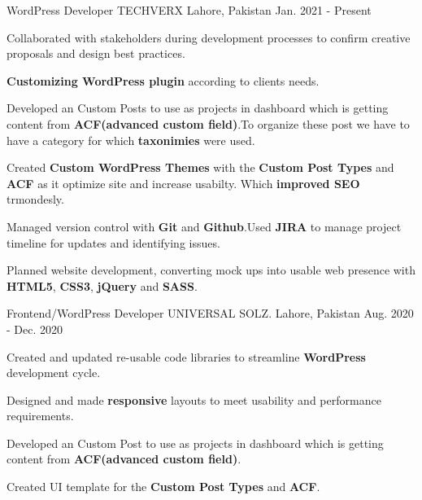 

\begin{cventries}

  \cventry
    {WordPress Developer} %
    {TECHVERX} %
    {Lahore, Pakistan} %
    {Jan. 2021 - Present} %
    {
      \begin{cvitems} %
        \item {Collaborated with stakeholders during development processes to confirm creative proposals and design best practices.}
        \item {\textbf{Customizing WordPress plugin} according to clients needs.}
        \item {Developed an Custom Posts to use as projects in dashboard which is getting content from \textbf{ACF(advanced custom field)}.To organize these post we have to have a category for which \textbf{taxonimies} were used.}
        \item {Created \textbf{Custom WordPress Themes} with the \textbf{Custom Post Types} and \textbf{ACF} as it optimize site and increase usabilty. Which \textbf{improved SEO} trmondesly.}
        \item {Managed version control with \textbf{Git} and \textbf{Github}.Used \textbf{JIRA} to manage project timeline for updates and identifying issues.}
        \item {Planned website development, converting mock ups into usable web presence with \textbf{HTML5}, \textbf{CSS3}, \textbf{jQuery} and \textbf{SASS}.}
      \end{cvitems}
    }

  \cventry
    {Frontend/WordPress Developer} %
    {UNIVERSAL SOLZ.} %
    {Lahore, Pakistan} %
    {Aug. 2020 - Dec. 2020} %
    {
      \begin{cvitems} %
        \item {Created and updated re-usable code libraries to streamline \textbf{WordPress} development cycle.}
        \item {Designed and made \textbf{responsive} layouts to meet usability and performance requirements.}
        \item {Developed an Custom Post to use as projects in dashboard which is getting content from \textbf{ACF(advanced custom field)}.}
        \item {Created UI template for the \textbf{Custom Post Types} and \textbf{ACF}.}
      \end{cvitems}
    }


\end{cventries}
